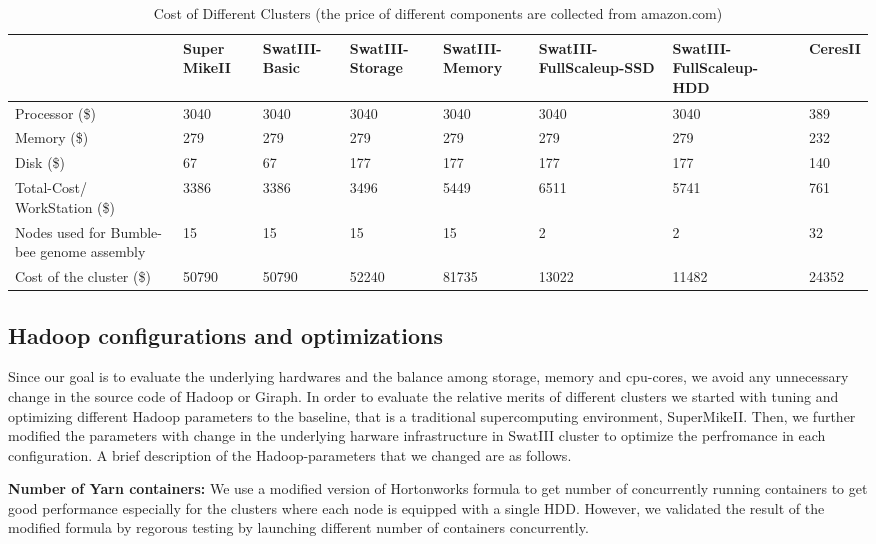 \documentclass[conference]{IEEEtran}
\begin{document}
\begin{table}
\begin{center}
    \begin{tabular}{ |p{1.8cm} | p{1.3cm} | p{1.3cm} | p{1.3cm} | p{1.3cm} | p{1.3cm} | p{1.3cm}| p{1.3cm}|} \hline
    & Super MikeII & SwatIII-Basic & SwatIII-Storage & SwatIII-Memory & SwatIII-FullScaleup-SSD & SwatIII-FullScaleup-HDD & CeresII \\ \hline
    Processor (\$) & 3040 & 3040 & 3040 & 3040 & 3040 & 3040 & 389 \\ \hline
    Memory (\$) & 279 & 279 & 279 & 279 & 279 & 279 & 232\\ \hline
    Disk (\$) & 67 & 67 & 177 & 177 & 177 & 177 &  140\\ \hline
    Total-Cost/ WorkStation (\$) & 3386 & 3386 & 3496 & 5449 & 6511 & 5741 & 761\\ \hline
    Nodes used for Bumble-bee genome assembly & 15 & 15 & 15 & 15 & 2 & 2 & 32 \\ \hline
    Cost of the cluster (\$) & 50790 & 50790 & 52240 & 81735 & 13022 & 11482 & 24352 \\ \hline
	\end{tabular}
    \caption{Cost of Different Clusters (the price of different components are collected from amazon.com)}
	\label{table:PricePerWorkstation}
\end{center}
\end{table}

\subsection {Hadoop configurations and optimizations} \label{HadoopConfigurationsAndoptimizations}
Since our goal is to evaluate the underlying hardwares and the balance among storage, memory and cpu-cores, we avoid any unnecessary change in the source code of Hadoop or Giraph. 
In order to evaluate the relative merits of different clusters we started with tuning and optimizing different Hadoop parameters to the baseline, that is a traditional supercomputing environment, SuperMikeII. Then, we further modified the parameters with change in the underlying harware infrastructure in SwatIII cluster to optimize the perfromance in each configuration.
A brief description of the Hadoop-parameters that we changed are as follows.
  
\textbf{Number of Yarn containers:} We use a modified version of Hortonworks formula to get number of concurrently running containers to get good performance especially for the clusters where each node is equipped with a single HDD. However, we validated the result of the modified formula by regorous testing by launching different number of containers concurrently.
\end{document}
